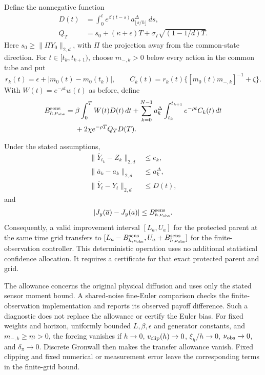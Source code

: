 Define the nonnegative function
\begin{align*}
 D(t)&=\int_0^t e^{\beta(t-s)}a_{\lfloor s/h\rfloor}^\Delta\,ds,\\
 Q_T&=s_0+(\kappa+\epsilon)T
                    +\sigma_I\sqrt{(1-1/d)T}.
\end{align*}
Here $s_0\geq\|\Pi Y_0\|_{2,d}$, with $\Pi$ the projection away from the common-state direction. For $t\in[t_k,t_{k+1})$, choose $m_{-,k}>0$ below every action in the
common tube and put
\[
 r_k(t)=\epsilon+|m_0(t)-m_0(t_k)|,
 \qquad C_k(t)=r_k(t)
           \{[m_0(t)m_{-,k}]^{-1}+\zeta\}.
\]
With $W(t)=e^{-\rho t}w(t)$ as before, define
\begin{equation}\label{eq:r14sensorpayoff}
 \begin{split}
 B^{\rm sens}_{h,\nu_{\rm obs}}={}&\beta\int_0^T W(t)D(t)\,dt
 +\sum_{k=0}^{N-1}a_k^\Delta
       \int_{t_k}^{t_{k+1}}e^{-\rho t}C_k(t)\,dt\\
 &+2\chi e^{-\rho T}Q_TD(T).
 \end{split}
\end{equation}

\begin{proposition}
\label{prop:r14sensor}
Under the stated assumptions,
\begin{align*}
 \|\overline Y_{t_k}-Z_k\|_{2,d}&\leq e_k,\\
 \|\overline a_k-a_k\|_{2,d}&\leq a_k^\Delta,\\
 \|\overline Y_t-Y_t\|_{2,d}&\leq D(t),
\end{align*}
and
\[
       |J_y(\overline a)-J_y(a)|\leq B^{\rm sens}_{h,\nu_{\rm obs}}.
\]
Consequently, a valid improvement interval $[L_a,U_a]$ for the
protected parent at the same time grid transfers to
$[L_a-B^{\rm sens}_{h,\nu_{\rm obs}},U_a+B^{\rm sens}_{h,\nu_{\rm obs}}]$ for the
finite-observation controller. This deterministic operation uses no
additional statistical confidence allocation. It requires a certificate
for that exact protected parent and grid.
\end{proposition}

The allowance concerns the original physical diffusion and uses only
the stated sensor moment bound. A shared-noise fine-Euler comparison
checks the finite-observation implementation and reports its observed
payoff difference. Such a diagnostic does not replace the allowance or
certify the Euler bias. For fixed weights and horizon, uniformly bounded $L,\beta,\epsilon$ and generator constants, and $m_{-,k}\geq\underline m>0$, the forcing vanishes if $h\to0$,
$v_{\rm clip}(h)\to0$, $\xi_h/h\to0$, $\nu_{\rm obs}\to0$, and
$\delta_\pi\to0$. Discrete Gronwall then makes the transfer allowance
vanish. Fixed clipping and fixed numerical or measurement error leave
the corresponding terms in the finite-grid bound.

